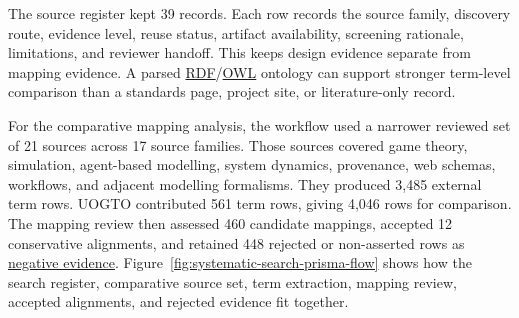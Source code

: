 \documentclass[11pt]{article}
\newcommand{\glslink}[2]{\hyperlink{gloss:#1}{#2}}
\newcommand{\abblink}[2]{\hyperlink{abbr:#1}{#2}}
\begin{document}
The source register kept 39 records. Each row records the source family, discovery route, evidence level, reuse status, artifact availability, screening rationale, limitations, and reviewer handoff. This keeps design evidence separate from mapping evidence. A parsed \abblink{rdf}{RDF}/\abblink{owl}{OWL} ontology can support stronger term-level comparison than a standards page, project site, or literature-only record.

For the comparative mapping analysis, the workflow used a narrower reviewed set of 21 sources across 17 source families. Those sources covered game theory, simulation, agent-based modelling, system dynamics, provenance, web schemas, workflows, and adjacent modelling formalisms. They produced 3,485 external term rows. UOGTO contributed 561 term rows, giving 4,046 rows for comparison. The mapping review then assessed 460 candidate mappings, accepted 12 conservative alignments, and retained 448 rejected or non-asserted rows as \glslink{negative-evidence}{negative evidence}. Figure~\ref{fig:systematic-search-prisma-flow} shows how the search register, comparative source set, term extraction, mapping review, accepted alignments, and rejected evidence fit together.
\end{document}
